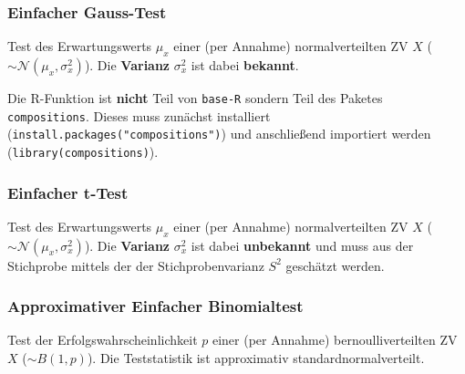 \documentclass[a4paper]{article}
\newcommand\dangersign[1][2ex]{%
  \renewcommand\stacktype{L}%
  \scaleto{\stackon[1.3pt]{\color{red}$\triangle$}{\tiny !}}{#1}%
}
\begin{document}
\subsubsection{Einfacher Gauss-Test}\label{sec:Gausstest1}
Test des Erwartungswerts $\mu_x$ einer (per Annahme) normalverteilten ZV $X$ ($\sim \mathcal{N}(\mu_x, \sigma_x^2)$). Die \textbf{Varianz} $\sigma_x^2$ ist dabei \textbf{bekannt}. \\

\noindent {}

\noindent \dangersign[3ex] Die R-Funktion ist \textbf{nicht} Teil von \texttt{base-R} sondern Teil des Paketes \texttt{compositions}. Dieses muss zunächst installiert (\texttt{install.packages("compositions")}) und anschließend importiert werden (\texttt{library(compositions)}).

\subsubsection{Einfacher t-Test}\label{sec:tTest1}
Test des Erwartungswerts $\mu_x$ einer (per Annahme) normalverteilten ZV $X$ ($\sim \mathcal{N}(\mu_x, \sigma_x^2)$). Die \textbf{Varianz} $\sigma_x^2$ ist dabei \textbf{unbekannt} und muss aus der Stichprobe mittels der der Stichprobenvarianz $S^2$ geschätzt werden.\\

\noindent {}

\subsubsection{Approximativer Einfacher Binomialtest}\label{sec:bintest1}
Test der Erfolgswahrscheinlichkeit $p$ einer (per Annahme) bernoulliverteilten ZV $X$ ($\sim B(1, p)$). Die Teststatistik ist approximativ standardnormalverteilt. \\

\noindent {}
\end{document}
